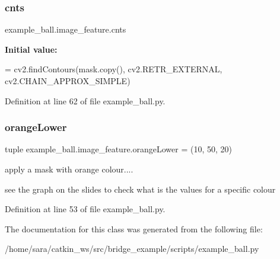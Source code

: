 \subsubsection{\texorpdfstring{cnts}{cnts}}
{\footnotesize\ttfamily example\+\_\+ball.\+image\+\_\+feature.\+cnts\hspace{0.3cm}{\ttfamily [static]}}

{\bfseries Initial value\+:}
\begin{DoxyCode}
=  cv2.findContours(mask.copy(), cv2.RETR\_EXTERNAL,
                                cv2.CHAIN\_APPROX\_SIMPLE)
\end{DoxyCode}


Definition at line 62 of file example\+\_\+ball.\+py.

\mbox{\label{classexample__ball_1_1image__feature_a718a0d65946dc0ee6c9cedf4072f0d27}} 
\subsubsection{\texorpdfstring{orange\+Lower}{orangeLower}}
{\footnotesize\ttfamily tuple example\+\_\+ball.\+image\+\_\+feature.\+orange\+Lower = (10, 50, 20)\hspace{0.3cm}{\ttfamily [static]}}



apply a mask with orange colour.... 

see the graph on the slides to check what is the values for a specific colour 

Definition at line 53 of file example\+\_\+ball.\+py.



The documentation for this class was generated from the following file\+:\begin{DoxyCompactItemize}
\item 
/home/sara/catkin\+\_\+ws/src/bridge\+\_\+example/scripts/example\+\_\+ball.\+py\end{DoxyCompactItemize}
